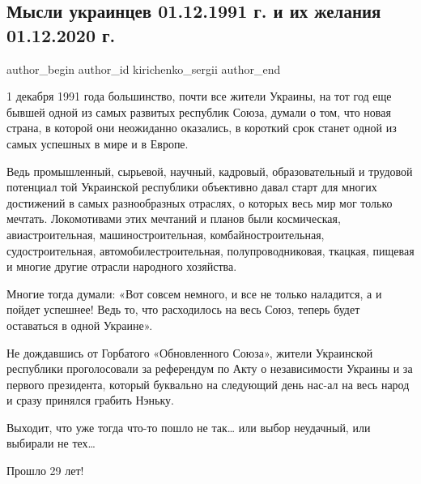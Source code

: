  
 
 
 
 
 
\subsection{Мысли украинцев 01.12.1991 г. и их желания 01.12.2020 г.}
\label{sec:01_12_2020.fb.kirichenko_sergii.1.mysli_ukraincev_zhelanija}
\ifcmt
	author_begin
   author_id kirichenko_sergii
	author_end
\fi

1 декабря 1991 года большинство, почти все жители Украины, на тот год еще
бывшей одной из самых развитых республик Союза, думали о том, что новая страна,
в которой они неожиданно оказались, в короткий срок станет одной из самых
успешных в мире и в Европе.

Ведь промышленный, сырьевой, научный, кадровый, образовательный и трудовой
потенциал той Украинской республики объективно давал старт для многих
достижений в самых разнообразных отраслях, о которых весь мир мог только
мечтать. Локомотивами этих мечтаний и планов были космическая,
авиастроительная, машиностроительная, комбайностроительная, судостроительная,
автомобилестроительная, полупроводниковая, ткацкая, пищевая и многие другие
отрасли народного хозяйства.

Многие тогда думали: «Вот совсем немного, и все не только наладится, а и пойдет
успешнее! Ведь то, что расходилось на весь Союз, теперь будет оставаться в
одной Украине».

Не дождавшись от Горбатого «Обновленного Союза», жители Украинской республики
проголосовали за референдум по Акту о независимости Украины и за первого
президента, который буквально на следующий день нас-ал на весь народ и сразу
принялся грабить Нэньку.

Выходит, что уже тогда что-то пошло не так… или выбор неудачный, или выбирали
не тех…

Прошло 29 лет!

